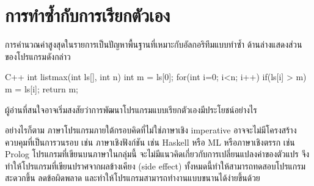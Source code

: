 \section{การ{\wbr}ทำ{\wbr}ซ้ำ{\wbr}กับ{\wbr}การ{\wbr}เรียก{\wbr}ตัวเอง}
การ{\wbr}คำนวณ{\wbr}ค่าสูงสุด{\wbr}ใน{\wbr}รายการ{\wbr}เป็น{\wbr}ปัญหา{\wbr}พื้นฐาน{\wbr}ที่{\wbr}เหมาะ{\wbr}กับ{\wbr}อัล{\wbr}กอ{\wbr}ริ{\wbr}ทึม{\wbr}แบบ{\wbr}ทำ{\wbr}ซ้ำ ด้าน{\wbr}ล่าง{\wbr}แสดง{\wbr}ส่วน{\wbr}ของ{\wbr}โปรแกรม{\wbr}ดังกล่าว{\wbr}

\latintext
\begin{codelist}{C++}{}
int listmax(int ls[], int n)
{
  int m = ls[0];
  for(int i=0; i<n; i++)
    if(ls[i] > m)
      m = ls[i];
  return m;
}
\end{codelist}
\thaitext

ผู้อ่าน{\wbr}ที่{\wbr}สนใจ{\wbr}อาจ{\wbr}เริ่ม{\wbr}สงสัย{\wbr}ว่า{\wbr}การ{\wbr}พัฒนา{\wbr}โปรแกรม{\wbr}แบบ{\wbr}เรียก{\wbr}ตัวเอง{\wbr}มี{\wbr}ประโยชน์{\wbr}อย่างไร 


อย่างไรก็ตาม ภาษา{\wbr}โปรแกรม{\wbr}ภายใต้{\wbr}กรอบ{\wbr}คิด{\wbr}ที่{\wbr}ไม่{\wbr}ใช่{\wbr}ภาษา{\wbr}เชิง imperative
อาจ{\wbr}จะ{\wbr}ไม่{\wbr}มี{\wbr}โครงสร้าง{\wbr}ควบคุม{\wbr}ที่{\wbr}เป็น{\wbr}การ{\wbr}วน{\wbr}รอบ เช่น ภาษา{\wbr}เชิง{\wbr}ฟังก์ชัน เช่น Haskell หรือ ML
หรือ{\wbr}ภาษา{\wbr}เชิง{\wbr}ตรรก เช่น Prolog โปรแกรม{\wbr}ที่{\wbr}เขียน{\wbr}บน{\wbr}ภาษา{\wbr}ใน{\wbr}กลุ่ม{\wbr}นี้{\wbr}
จะ{\wbr}ไม่{\wbr}มี{\wbr}แนว{\wbr}คิด{\wbr}เกี่ยวกับ{\wbr}การ{\wbr}เปลี่ยนแปลง{\wbr}ค่า{\wbr}ของ{\wbr}ตัวแปร{\wbr}
จึง{\wbr}ทำ{\wbr}ให้{\wbr}โปรแกรม{\wbr}ที่{\wbr}เขียน{\wbr}ปราศจาก{\wbr}ผลข้างเคียง (side effect)
ทั้งหมด{\wbr}นี้{\wbr}ทำ{\wbr}ให้{\wbr}สามารถ{\wbr}ทดสอบ{\wbr}โปรแกรม{\wbr}สะดวก{\wbr}ขึ้น ลด{\wbr}ข้อผิดพลาด{\wbr}
และ{\wbr}ทำ{\wbr}ให้{\wbr}โปรแกรม{\wbr}สามารถ{\wbr}ทำงาน{\wbr}แบบ{\wbr}ขนาน{\wbr}ได้{\wbr}ง่าย{\wbr}ขึ้น{\wbr}ด้วย{\wbr}




